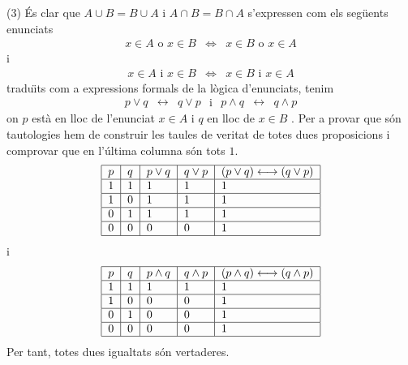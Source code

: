 \begin{solucio}
(3) \'{E}s clar que $A\cup B=B\cup A$ i $A\cap B=B\cap A$ s'expressen com
els seg\"{u}ents enunciats%
\begin{equation*}
\begin{array}{ccc}
x\in A\text{ o }x\in B & \Longleftrightarrow & x\in B\text{ o }x\in A%
\end{array}%
\end{equation*}%
i%
\begin{equation*}
\begin{array}{ccc}
x\in A\text{ i }x\in B & \Longleftrightarrow & x\in B\text{ i }x\in A%
\end{array}%
\end{equation*}%
tradu\"{\i}ts com a expressions formals de la l\`{o}gica d'enunciats, tenim%
\begin{equation*}
\begin{array}{ccc}
p\vee q & \longleftrightarrow & q\vee p%
\end{array}%
\text{ \ \ i \ \ }%
\begin{array}{ccc}
p\wedge q & \longleftrightarrow & q\wedge p%
\end{array}%
\end{equation*}%
on $p$ est\`{a} en lloc de l'enunciat $x\in A$ i $q$ en lloc de $x\in B$ .
Per a provar que s\'{o}n tautologies hem de construir les taules de veritat
de totes dues proposicions i comprovar que en l'\'{u}ltima columna s\'{o}n
tots $1$.%
\begin{equation*}
\begin{tabular}{|l|l|l|l|l|}
\hline
$p$ & $q$ & $p\vee q$ & $q\vee p$ & $(p\vee q)\longleftrightarrow (q\vee p)$
\\ \hline
$1$ & $1$ & $1$ & $1$ & $1$ \\ \hline
$1$ & $0$ & $1$ & $1$ & $1$ \\ \hline
$0$ & $1$ & $1$ & $1$ & $1$ \\ \hline
$0$ & $0$ & $0$ & $0$ & $1$ \\ \hline
\end{tabular}%
\end{equation*}%
i%
\begin{equation*}
\begin{tabular}{|l|l|l|l|l|}
\hline
$p$ & $q$ & $p\wedge q$ & $q\wedge p$ & $(p\wedge q)\longleftrightarrow
(q\wedge p)$ \\ \hline
$1$ & $1$ & $1$ & $1$ & $1$ \\ \hline
$1$ & $0$ & $0$ & $0$ & $1$ \\ \hline
$0$ & $1$ & $0$ & $0$ & $1$ \\ \hline
$0$ & $0$ & $0$ & $0$ & $1$ \\ \hline
\end{tabular}%
\end{equation*}%
Per tant, totes dues igualtats s\'{o}n vertaderes.


\end{solucio}
